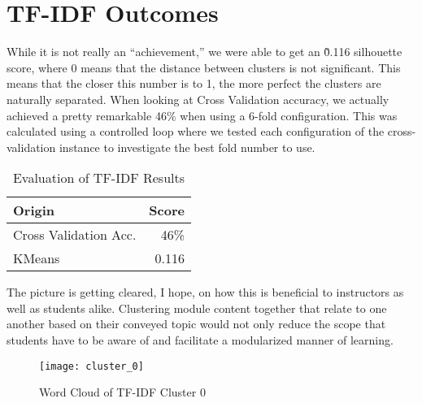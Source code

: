 \chapter{TF-IDF Outcomes}
\label{ch:tfidfoutcomes}

While it is not really an “achievement,” we were able to get an \~0.116 silhouette score, where 0 means that the distance between clusters is not significant. This means that the closer this number is to 1, the more perfect the clusters are naturally separated. When looking at Cross Validation accuracy, we actually achieved a pretty remarkable 46\% when using a 6-fold configuration. This was calculated using a controlled loop where we tested each configuration of the cross-validation instance to investigate the best fold number to use.

\begin{table}
  \centering
  \label{tab:tfidf_outcomes}
  \begin{tabular}{ | l | r | }
    \hline
    \textbf{Origin} & \textbf{Score} \\
    \hline
    Cross Validation Acc. & 46\% \\
    \hline
    KMeans & 0.116 \\
    \hline
  \end{tabular}
  \caption{Evaluation of TF-IDF Results}
\end{table}

The picture is getting cleared, I hope, on how this is beneficial to instructors as well as students alike. Clustering module content together that relate to one another based on their conveyed topic would not only reduce the scope that students have to be aware of and facilitate a modularized manner of learning.

\begin{figure}
  \centering
  \texttt{[image: cluster\_0]}
  \caption{Word Cloud of TF-IDF Cluster 0}
  \label{fig:tfidf_wordcloud}
\end{figure}
